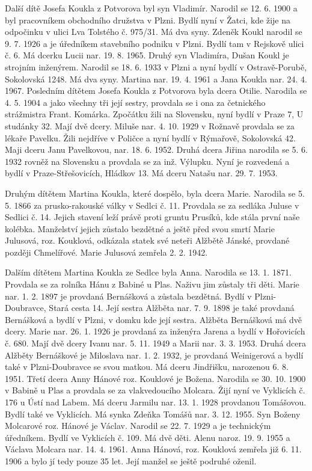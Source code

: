 \documentclass[../dejiny-rodu-prusiku.tex]{subfiles}
\begin{document}
Další dítě Josefa Koukla z Potvorova byl syn Vladimír. Narodil se 12. 6. 1900 a byl pracovníkem obchodního druž­stva v Plzni. Bydlí nyní v Žatci, kde žije na odpočinku v ulici Lva Tolstého č. 975/31. Má dva syny. Zdeněk Koukl narodil se 9. 7. 1926 a je úředníkem stavebního podniku v Plzni. Bydlí tam v Rejskově ulici č. 6. Má dcerku Lucii nar. 19. 8. 1965. Druhý syn Vladimíra, Dušan Koukl je strojním inženýrem. Narodil se 18. 6. 1933 v Plzni a nyní bydlí v Ostravě-Porubě, Sokolovská 1248. Má dva syny. Martina nar. 19. 4. 1961 a Jana Koukla nar. 24. 4. 1967. Posledním dítětem Josefa Koukla z Potvorova byla dcera Otilie. Narodila se 4. 5. 1904 a jako všechny tři její sestry, provdala se i ona za četnického strážmistra Frant. Komárka. Zpočátku žili na Slovensku, nyní bydlí v Praze 7, U studánky 32. Mají dvě dcery. Miluše nar. 4. 10. 1929 v Rožnavě provdala se za lékaře Pavelku. Žili nejdříve v
Poličce a nyní bydlí v Rýmařově, Sokolovská 42. Maji dceru Janu Pavelkovou, nar. 18. 6. 1952. Druhá dcera Jiřina narodila se 5. 6. 1932 rovněž na Slovensku a provdala se za inž. Výlupku. Nyní je roz­vedená a bydlí v Praze-Střešovicích, Hládkov 13. Má dceru Natašu nar. 29. 7. 1953.

Druhým dítětem Martina Koukla, které dospělo, byla dcera Marie. Narodila se 5. 5. 1866 za prusko-rakouské války v Sedlci č. 11. Provdala se za sedláka Juluse v Sedlici č. 14. Jejich stavení leží právě proti gruntu Prusíků, kde stála první naše kolébka. Manželství jejich zůstalo bezdětné a ještě před svou smrtí Marie Julusová, roz. Kouklová, odkázala statek své neteři Alžbětě Jánské, provdané později Chmelířové. Marie Julusová zemřela 2. 2. 1942.

Dalším dítětem Martina Koukla ze Sedlce byla Anna. Narodila se 13. 1. 1871. Provdala se za rolníka Hánu z Babiné u Plas. Naživu jim zůstaly tři děti. Marie nar. 1. 2. 1897 je provdaná Bernášková a zůstala bezdětná. Bydlí v Plzni-Doubravce, Stará cesta 14. Její sestra Alžběta nar. 7. 9. 1898 je také provdaná Bernášková a bydlí v Plzni, v domku kde její sestra. Alžběta Ber­nášková má dvě dcery. Marie nar. 26. 1. 1926 je provda­ná za inženýra Jarena a bydlí v Hořovicích č. 680. Mají dvě dcery Ivanu nar. 5. 11. 1949 a Marii nar. 3. 3. 1953. Druhá dcera Alžběty Bernáškové je Miloslava nar. 1. 2. 1932, je provdaná Weinigerová a bydlí také v Plzni-Doubravce se svou matkou. Má dceru Jindřišku, narozenou 6. 8. 1951. Třetí dcera Anny Hánové roz. Kouklové je Božena. Narodila se 30. 10. 1900 v Babině u Plas a provdala se za vlakvedoucího Molcara. Žijí nyní ve Vyklicích č. 176 u Ústí nad Labem. Má dceru Jarmilu nar. 13. 1. 1928 provdanou Tomášovou. Bydlí také ve Vyklicích. Má synka Zdeňka Tomášů nar. 3. 12. 1955. Syn Boženy Molcarové roz. Hánové je Václav. Narodil se 22. 7. 1929 a je tech­nickým úředníkem. Bydlí ve Vyklicích č. 109. Má dvě děti. Alenu naroz. 19. 9. 1955 a Václava Molcara nar. 14. 4. 1961. Anna Hánová, roz. Kouklová zemřela již 6. 11. 1906 a bylo jí tedy pouze 35 let. Její manžel se ještě podruhé oženil.
\end{document}
